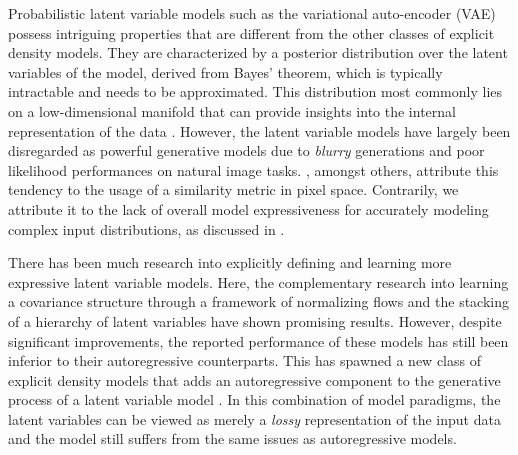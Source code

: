 \documentclass{article}
\begin{document}
Probabilistic latent variable models such as the variational auto-encoder (VAE) \citep{Kingma13,Rezende14} possess intriguing properties that are different from the other classes of explicit density models. They are characterized by a posterior distribution over the latent variables of the model, derived from Bayes' theorem, which is typically intractable and needs to be approximated.
This distribution most commonly lies on a low-dimensional manifold that can provide insights into the internal representation of the data \citep{Bengio2013a}. However, the latent variable models have largely been disregarded as powerful generative models due to \textit{blurry} generations and poor likelihood performances on natural image tasks. \citep{Larsen16,Dosovitskiy2016}, amongst others, attribute this tendency to the usage of a similarity metric in pixel space. Contrarily, we attribute it to the lack of overall model expressiveness for accurately modeling complex input distributions, as discussed in \citep{ZhaoSE17, rezende2018taming}.

There has been much research into explicitly defining and learning more expressive latent variable models. Here, the complementary research into learning a covariance structure through a framework of normalizing flows \citep{Rezende2015,Tomczak16,Kingma2016} and the stacking of a hierarchy of latent variables \citep{Burda15,Ranganath2015,Maaloe2016,Sonderby2016} have shown promising results. However, despite significant improvements, the reported performance of these models has still been inferior to their autoregressive counterparts. This has spawned a new class of explicit density models that adds an autoregressive component to the generative process of a latent variable model \citep{Gulrajani2016,Chen2017}. In this combination of model paradigms, the latent variables can be viewed as merely a  \textit{lossy} representation of the input data and the model still suffers from the same issues as autoregressive models.
\end{document}
